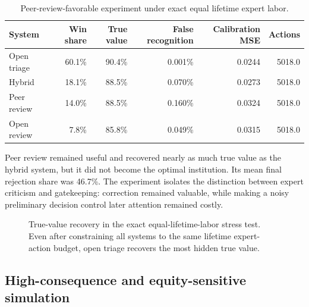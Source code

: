 \documentclass[11pt]{article}
\begin{document}
\begin{table}[ht]
\centering
\caption{Peer-review-favorable experiment under exact equal lifetime expert labor.}
\label{tab:equalbudget}
\small
\begin{tabular}{lrrrrr}
\toprule
System & Win share & True value & False recognition & Calibration MSE & Actions\\
\midrule
Open triage & 60.1\% & 90.4\% & 0.001\% & 0.0244 & 5018.0\\
Hybrid & 18.1\% & 88.5\% & 0.070\% & 0.0273 & 5018.0\\
Peer review & 14.0\% & 88.5\% & 0.160\% & 0.0324 & 5018.0\\
Open review & 7.8\% & 85.8\% & 0.049\% & 0.0315 & 5018.0\\
\bottomrule
\end{tabular}
\end{table}

Peer review remained useful and recovered nearly as much true value as the hybrid system, but it did not become the optimal institution. Its mean final rejection share was 46.7\%. The experiment isolates the distinction between expert criticism and gatekeeping: correction remained valuable, while making a noisy preliminary decision control later attention remained costly.


\begin{figure}[ht]
\centering
{}
\caption{True-value recovery in the exact equal-lifetime-labor stress test. Even after constraining all systems to the same lifetime expert-action budget, open triage recovers the most hidden true value.}
\label{fig:equalbudget_truevalue}
\end{figure}

\subsection{High-consequence and equity-sensitive simulation}
\end{document}
